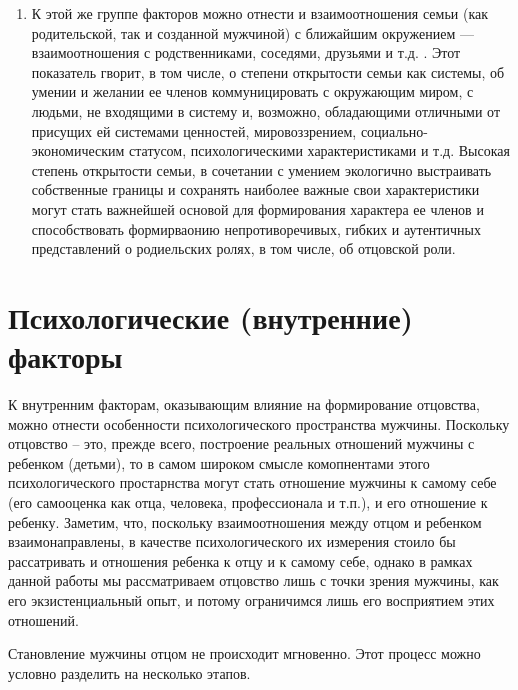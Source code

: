 \documentclass{../../common/thesisbyxetex}
\begin{document}
\begin{enumerate}
\item К этой же группе факторов можно отнести и взаимоотношения семьи (как родительской, так и
созданной мужчиной) с ближайшим окружением --- взаимоотношения с родственниками, соседями, друзьями
и т.д. \cite[40]{otage}. Этот показатель гворит, в том числе, о степени открытости семьи как
системы, об умении и желании ее членов коммуницировать с окружающим миром, с людьми, не входящими в
систему и, возможно, обладающими отличными от присущих ей системами ценностей, мировоззрением,
социально-экономическим статусом, психологическими характеристиками и т.д. Высокая степень
открытости семьи, в сочетании с умением экологично выстраивать собственные границы и сохранять
наиболее важные свои характеристики могут стать важнейшей основой для формирования характера
ее членов и способствовать формирваонию непротиворечивых, гибких и аутентичных представлений о
родиельских ролях, в том числе, об отцовской роли.

\end{enumerate}




\section{Психологические (внутренние) факторы}

К внутренним факторам, оказывающим влияние на формирование отцовства, можно отнести  особенности
психологического пространства мужчины. Поскольку отцовство -- это, прежде всего, построение
реальных отношений мужчины с ребенком (детьми), то в самом широком смысле комопнентами этого
психологического простарнства могут стать отношение мужчины к самому себе (его самооценка как отца,
человека, профессионала и т.п.), и его отношение к ребенку. Заметим, что, поскольку взаимоотношения
между отцом и ребенком взаимонаправлены, в качестве психологического их измерения стоило бы
рассатривать и отношения ребенка к отцу и к самому себе, однако в рамках данной работы мы
рассматриваем отцовство лишь с точки зрения мужчины, как его экзистенциальный опыт, и потому
ограничимся лишь его восприятием этих отношений.

Становление мужчины отцом не происходит мгновенно. Этот процесс можно условно разделить на
несколько этапов.
\end{document}

